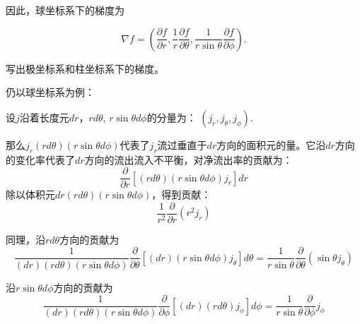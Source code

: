\documentclass[CJK]{beamer}
\begin{document}
\begin{frame}
  \bch

  因此，球坐标系下的梯度为

  $$\nabla f = \left(\frac{\partial f}{\partial r}, \frac{1}{r}\frac{\partial f}{\partial \theta}, \frac{1}{r\sin\theta}\frac{\partial f}{\partial \phi} \right).$$
  \ech
\end{frame}



\begin{frame}
\bch


写出极坐标系和柱坐标系下的梯度。

\ech
\end{frame}



\begin{frame}
  \bch

仍以球坐标系为例：

  设$j$沿着长度元$dr$，$rd\theta$, $r\sin\theta d\phi$的分量为：
  $(j_r, j_\theta, j_\phi).$

  那么$j_r(rd\theta)(r\sin\theta d\phi)$代表了$j_r$流过垂直于$dr$方向的面积元的量。它沿$dr$方向的变化率代表了$dr$方向的流出流入不平衡，对净流出率的贡献为：
  $$\frac{\partial }{\partial r} \left[(rd\theta)(r\sin\theta d\phi)j_r\right]dr$$
  除以体积元$dr (rd\theta)(r\sin\theta d\phi)$，得到贡献：
  $$\frac{1}{r^2}\frac{\partial }{\partial r} \left(r^2j_r\right)$$  
  \ech
\end{frame}


\begin{frame}
  \bch

  同理，沿$rd \theta$方向的贡献为
 $$\frac{1}{(dr) (rd\theta) (r\sin\theta d\phi)}\frac{\partial }{\partial \theta} \left[(dr)(r\sin\theta d\phi)j_\theta\right] d\theta  = \frac{1}{r\sin\theta}\frac{\partial  }{\partial \theta} \left( \sin\theta j_\theta\right) $$

  沿$r\sin\theta d\phi$方向的贡献为
  $$\frac{1}{(dr) (rd\theta) (r\sin\theta d\phi)}\frac{\partial }{\partial \phi} \left[(dr)(rd\theta)j_\phi\right] d\phi = \frac{1}{r\sin\theta}\frac{\partial  }{\partial \phi} j_\phi $$
  
  \ech
\end{frame}
\end{document}
